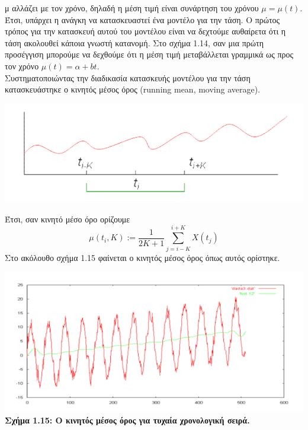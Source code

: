 μ αλλάζει με τον χρόνο, δηλαδή η μέση τιμή είναι συνάρτηση του χρόνου $ \mu=\mu\left(t\right).$
Έτσι, υπάρχει η ανάγκη να κατασκευαστεί ένα μοντέλο για την τάση. Ο πρώτος
τρόπος για την κατασκευή αυτού του μοντέλου είναι να δεχτούμε αυθαίρετα ότι η
τάση ακολουθεί κάποια γνωστή κατανομή. Στο σχήμα 1.14, σαν μια πρώτη προσέγγιση
μπορούμε να δεχθούμε ότι η μέση τιμή μεταβάλλεται γραμμικά ως προς τον χρόνο
$ \mu\left(t\right)=\alpha+bt.$\\
Συστηματοποιώντας την διαδικασία κατασκευής μοντέλου για την τάση κατασκευάστηκε ο κινητός μέσος όρος (running mean, moving average).\\
\begin{center}
\includegraphics[scale=0.5]{graf12.png}\\
\end{center}
Έτσι, σαν κινητό μέσο όρο ορίζουμε\\
$$ \mu\left(t_i,K\right):=\frac{1}{2K+1} \sum_{j=i-K}^{i+K} X\left(t_j\right)$$
Στο ακόλουθο σχήμα 1.15 φαίνεται ο κινητός μέσος
όρος όπως αυτός ορίστηκε.\\
\begin{center}
\includegraphics[scale=0.5]{graf13.png}\\
\textbf{Σχήμα 1.15: Ο κινητός μέσος όρος για τυχαία χρονολογική σειρά.}
\end{center}

